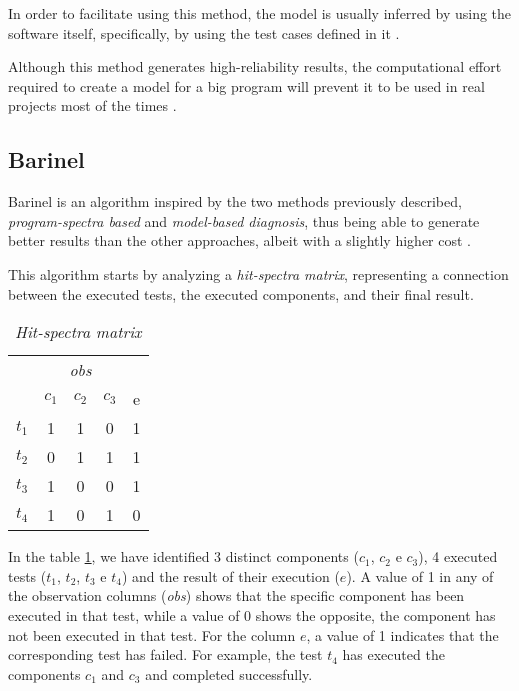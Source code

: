 In order to facilitate using this method, the model is usually inferred by using the software itself, specifically, by using the test cases defined in it \cite{Perez2004}.

Although this method generates high-reliability results, the computational effort required to create a model for a big program will prevent it to be used in real projects most of the times \cite{Mayer2008}.

% 
%

\subsection{Barinel}

Barinel is an algorithm inspired by the two methods previously described, \emph{program-spectra based} and \emph{model-based diagnosis}, thus being able to generate better results than the other approaches, albeit with a slightly higher cost \cite{Abreu2009}.

This algorithm starts by analyzing a \emph{hit-spectra matrix}, representing a connection between the executed tests, the executed components, and their final result.

\begin{table}[H]
  \centering
  \begin{tabular}{c|ccc|c} 
    & \multicolumn{3}{c|}{\textit{obs}} &  \\
    & $c_1$ & $c_2$ & $c_3$ & e \\ 
    \hline
    $t_1$ & 1 & 1 & 0 & 1 \\
    $t_2$ & 0 & 1 & 1 & 1 \\
    $t_3$ & 1 & 0 & 0 & 1 \\
    $t_4$ & 1 & 0 & 1 & 0 \\
  \end{tabular}
  \caption{\emph{Hit-spectra matrix}}
  \label{tab:hit-spectra}
\end{table}


In the table \ref{tab:hit-spectra}, we have identified 3 distinct components ($c_1$, $c_2$ e $c_3$), 4 executed tests ($t_1$, $t_2$, $t_3$ e $t_4$) and the result of their execution ($e$). A value of 1 in any of the observation columns (\emph{obs}) shows that the specific component has been executed in that test, while a value of 0 shows the opposite, the component has not been executed in that test. For the column $e$, a value of 1 indicates that the corresponding test has failed. 
For example, the test $t_4$ has executed the components $c_1$ and $c_3$ and completed successfully.


